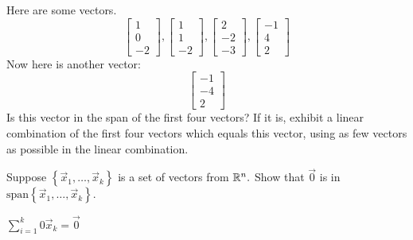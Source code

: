 \documentclass{ximera}
\begin{document}
\begin{problem}\label{prb:3.13} Here are some vectors.
\begin{equation*}
\left[
\begin{array}{r}
1 \\
0 \\
-2
\end{array}
\right] ,\left[
\begin{array}{r}
1 \\
1 \\
-2
\end{array}
\right] ,\left[
\begin{array}{r}
2 \\
-2 \\
-3
\end{array}
\right] ,\left[
\begin{array}{r}
-1 \\
4 \\
2
\end{array}
\right]
\end{equation*}
Now here is another vector:\
\begin{equation*}
\left[
\begin{array}{r}
-1 \\
-4 \\
2
\end{array}
\right]
\end{equation*}
Is this vector in the span of the first four vectors? If it is, exhibit a
linear combination of the first four vectors which equals this vector, using
as few vectors as possible in the linear combination.
\end{problem}


\begin{problem}\label{prb:3.14} Suppose $\left\{ \vec{x}_{1},\ldots ,\vec{x}_{k}\right\} $ is a
set of vectors from $\mathbb{R}^{n}.$ Show that $\vec{0}$ is in $\mbox{
span}\left\{ \vec{x}_{1},\ldots ,\vec{x}_{k}\right\} .$
\begin{hint}
$\sum_{i=1}^{k}0\vec{x}_{k}=\vec{0}$
\end{hint}
\end{problem}
\end{document}
